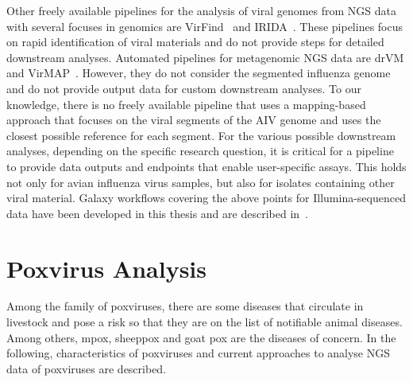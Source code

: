 Other freely available pipelines for the analysis of viral genomes from \ac{NGS} data with several focuses in genomics are VirFind~\cite{ho2014development} and \ac{IRIDA}~\cite{matthews2018integrated}. These pipelines focus on rapid identification of viral materials and do not provide steps for detailed downstream analyses. Automated pipelines for metagenomic \ac{NGS} data are \ac{drVM} and VirMAP~\cite{lin2017drvm, ajami2018maximal}. However, they do not consider the segmented influenza genome and do not provide output data for custom downstream analyses. To our knowledge, there is no freely available pipeline that uses a mapping-based approach that focuses on the viral segments of the \ac{AIV} genome and uses the closest possible reference for each segment. For the various possible downstream analyses, depending on the specific research question, it is critical for a pipeline to provide data outputs and endpoints that enable user-specific assays. This holds not only for avian influenza virus samples, but also for isolates containing other viral material. Galaxy workflows covering the above points for Illumina-sequenced data have been developed in this thesis and are described in~.

\section{Poxvirus Analysis}\label{sec:2-pox}
Among the family of poxviruses, there are some diseases that circulate in livestock and pose a risk so that they are on the list of notifiable animal diseases. Among others, mpox, sheeppox and goat pox are the diseases of concern. In the following, characteristics of poxviruses and current approaches to analyse \ac{NGS} data of poxviruses are described.

